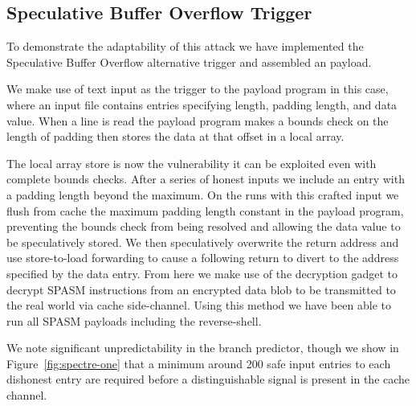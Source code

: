 
\subsection{Speculative Buffer Overflow Trigger}
\label{subsec:sbo-impl}


To demonstrate the adaptability of this attack we have implemented the 
Speculative Buffer Overflow alternative trigger and assembled an \speculake 
payload. 

We make use of text input as the trigger to the payload program in this case,
where an input file contains entries specifying length, padding length,
and data value. When a line is read the payload program makes a bounds
check on the length of padding then stores the data at that offset in a
local array. 

The local array store is now the vulnerability it can be exploited even with
complete bounds checks. After a series of honest inputs we include an entry with
a padding length beyond the maximum. On the runs with this crafted input we
flush from cache the maximum padding length constant in the payload program,
preventing the bounds check from being resolved and allowing the data value to
be speculatively stored. We then speculatively overwrite the return address and
use store-to-load forwarding to cause a following return to divert to the
address specified by the data entry. From here we make use of the decryption
gadget to decrypt SPASM instructions from an encrypted data blob to be
transmitted to the real world via cache side-channel. Using this method we have
been able to run all SPASM payloads including the reverse-shell. 

We note significant unpredictability in the branch predictor, though we
show in Figure~\ref{fig:spectre-one} that a minimum around 200 safe input entries
to each dishonest entry are required before a distinguishable signal is present 
in the cache channel. 
\fi
